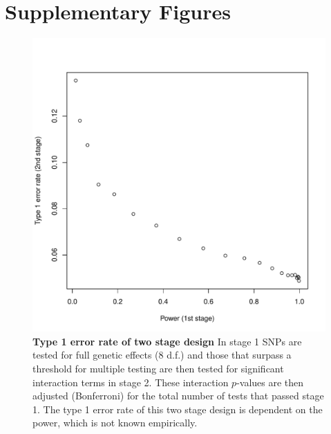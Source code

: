 \documentclass{article}
\begin{document}
\clearpage


\clearpage


\section*{Supplementary Figures}
\setcounter{figure}{0}
\makeatletter 
\renewcommand{\thefigure}{S\@arabic\c@figure} 
\makeatletter 


\begin{figure}[H]
	\centering
	\includegraphics[width=5in]{type1}
	\caption{\textbf{Type 1 error rate of two stage design} In stage 1 SNPs are tested for full genetic effects (8 d.f.) and those that surpass a threshold for multiple testing are then tested for significant interaction terms in stage 2. These interaction $p$-values are then adjusted (Bonferroni) for the total number of tests that passed stage 1. The type 1 error rate of this two stage design is dependent on the power, which is not known empirically.}
\label{fig:type1}
\end{figure}
\clearpage
\end{document}

